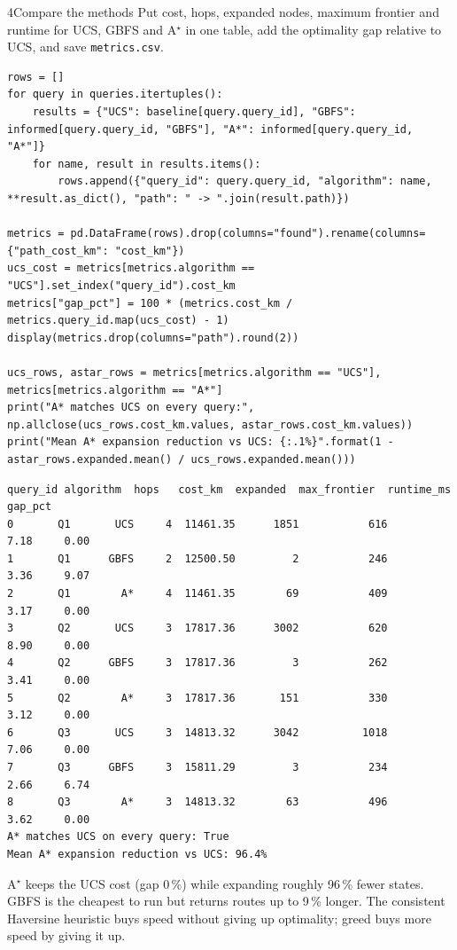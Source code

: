\begin{labquestion}{4}{Compare the methods}
Put cost, hops, expanded nodes, maximum frontier and runtime for UCS, GBFS and A$^\star$ in one table, add the optimality gap relative to UCS, and save \texttt{metrics.csv}.
\end{labquestion}

\begin{labanswer}
\begin{lstlisting}[style=utppython]
rows = []
for query in queries.itertuples():
    results = {"UCS": baseline[query.query_id], "GBFS": informed[query.query_id, "GBFS"], "A*": informed[query.query_id, "A*"]}
    for name, result in results.items():
        rows.append({"query_id": query.query_id, "algorithm": name, **result.as_dict(), "path": " -> ".join(result.path)})

metrics = pd.DataFrame(rows).drop(columns="found").rename(columns={"path_cost_km": "cost_km"})
ucs_cost = metrics[metrics.algorithm == "UCS"].set_index("query_id").cost_km
metrics["gap_pct"] = 100 * (metrics.cost_km / metrics.query_id.map(ucs_cost) - 1)
display(metrics.drop(columns="path").round(2))

ucs_rows, astar_rows = metrics[metrics.algorithm == "UCS"], metrics[metrics.algorithm == "A*"]
print("A* matches UCS on every query:", np.allclose(ucs_rows.cost_km.values, astar_rows.cost_km.values))
print("Mean A* expansion reduction vs UCS: {:.1%}".format(1 - astar_rows.expanded.mean() / ucs_rows.expanded.mean()))
\end{lstlisting}
\expectedoutput
\begin{lstlisting}[style=utpterminal]
  query_id algorithm  hops   cost_km  expanded  max_frontier  runtime_ms  gap_pct
0       Q1       UCS     4  11461.35      1851           616        7.18     0.00
1       Q1      GBFS     2  12500.50         2           246        3.36     9.07
2       Q1        A*     4  11461.35        69           409        3.17     0.00
3       Q2       UCS     3  17817.36      3002           620        8.90     0.00
4       Q2      GBFS     3  17817.36         3           262        3.41     0.00
5       Q2        A*     3  17817.36       151           330        3.12     0.00
6       Q3       UCS     3  14813.32      3042          1018        7.06     0.00
7       Q3      GBFS     3  15811.29         3           234        2.66     6.74
8       Q3        A*     3  14813.32        63           496        3.62     0.00
A* matches UCS on every query: True
Mean A* expansion reduction vs UCS: 96.4%
\end{lstlisting}
A$^\star$ keeps the UCS cost (gap 0\,\%) while expanding roughly 96\,\% fewer states. GBFS is the cheapest to run but returns routes up to 9\,\% longer. The consistent Haversine heuristic buys speed without giving up optimality; greed buys more speed by giving it up.
\end{labanswer}

